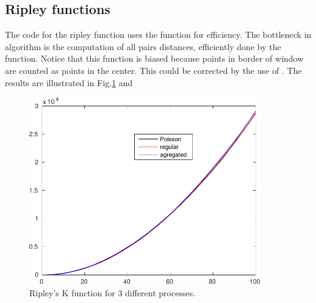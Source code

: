 \subsection{Ripley functions}
The code for the ripley function uses the \matlabregistered{} function  for efficiency. The bottleneck in algorithm is the computation of all pairs distances, efficiently done by the  function. Notice that this function is biased because points in border of window are counted as points in the center. This could be corrected by the use of . The results are illustrated in 
Fig.\ref{fig:point_process_generation:matlab:ripleyK} and 

\begin{figure}
 \centering
 \includegraphics[width=10cm]{ripleyK.pdf}
 \caption{Ripley's K function for 3 different processes.}
 \label{fig:point_process_generation:matlab:ripleyK}
\end{figure}
 
